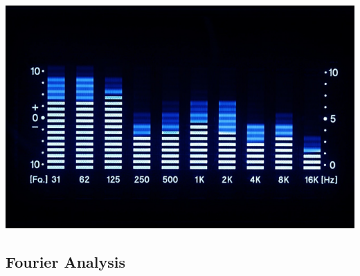 \documentclass[11pt]{article}
\begin{document}
\includegraphics[width=\textwidth]{frequency-domain-2.png}
\subsection{Fourier Analysis}
\end{document}
